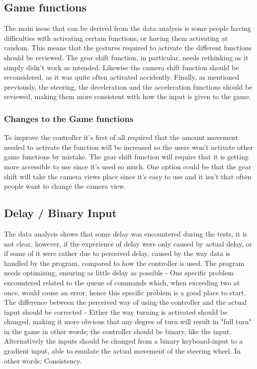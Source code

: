 \subsection{Game functions}
The main issue that can be derived from the data analysis is some people having difficulties with activating certain functions, or having them activating at random. This means that the gestures required to activate the different functions should be reviewed.
The gear shift function, in particular, needs rethinking as it simply didn't work as intended. Likewise the camera shift function should be reconsidered, as it was quite often activated accidently. Finally, as mentioned previously, the steering, the deceleration and the acceleration functions should be reviewed, making them more consistent with how the input is given to the game.


\subsubsection*{Changes to the Game functions}
To improve the controller it’s first of all required that the amount movement needed to activate the function will be increased so the users won’t activate other game functions by mistake. The gear shift function will require that it is getting more accessible to use since it’s used so much. One option could be that the gear shift will take the camera views place since it’s easy to use and it isn’t that often people want to change the camera view.


\subsection{Delay / Binary Input}
The data analysis shows that some delay was encountered during the tests, it is not clear, however, if the experience of delay were only caused by actual delay, or if some of it were rather due to perceived delay, caused by the way data is handled by the program, compared to how the controller is used.
The program needs optimizing, ensuring as little delay as possible - One specific problem encountered related to the queue of commands which, when exceeding two at once, would cause an error, hence this specific problem is a good place to start.
The difference between the perceived way of using the controller and the actual input should be corrected - Either the way turning is activated should be changed, making it more obvious that any degree of turn will result in "full turn" in the game in other words; the controller should be binary, like the input. Alternatively the inputs should be changed from a binary keyboard-input to a gradient input, able to emulate the actual movement of the steering wheel. In other words; Consistency.


